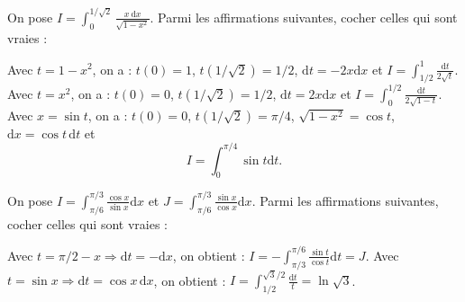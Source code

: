 \begin{question}
On pose $\displaystyle I=\int _{0}^{1/\sqrt{2}}\frac{x\ \mathrm{d}x}{\sqrt{1-x^2}}$. Parmi les affirmations suivantes, cocher celles qui sont vraies :
\begin{answers}
\end{answers}
\vskip3mm
\begin{explanations}
Avec $t=1-x^2$, on a : $t(0)=1$, $t(1/\sqrt{2})=1/2$, $\mathrm{d}t=-2x\mathrm{d}x$ et $\displaystyle I=\int _{1/2}^1\frac{\mathrm{d}t}{2\sqrt{t}}$.
\vskip0mm
Avec $t=x^2$, on a : $t(0)=0$, $t(1/\sqrt{2})=1/2$, $\mathrm{d}t=2x\mathrm{d}x$ et $\displaystyle I=\int _0^{1/2}\frac{\mathrm{d}t}{2\sqrt{1-t}}$.
\vskip0mm
Avec $x=\sin t$, on a : $t(0)=0$, $t(1/\sqrt{2})=\pi/4$, $\sqrt{1-x^2}=\cos t$, $\mathrm{d}x=\cos t\, \mathrm{d}t$ et 
$$\displaystyle I=\int _0^{\pi/4}\sin t\mathrm{d}t.$$
\end{explanations}
\end{question}

\begin{question}
On pose $\displaystyle I=\int _{\pi/6}^{\pi/3}\frac{\cos x}{\sin x}\mathrm{d}x$ et $\displaystyle J=\int _{\pi/6}^{\pi/3}\frac{\sin x}{\cos x}\mathrm{d}x$. Parmi les affirmations suivantes, cocher celles qui sont vraies :
\begin{answers}
\end{answers}
\begin{explanations}
Avec $t=\pi/2- x\Rightarrow \mathrm{d}t=-\mathrm{d}x$, on obtient : $\displaystyle I=-\int _{\pi/3}^{\pi/6}\frac{\sin t}{\cos t}\mathrm{d}t=J$.
\vskip0mm
Avec $t=\sin x\Rightarrow \mathrm{d}t=\cos x\, \mathrm{d}x$, on obtient : $\displaystyle I=\int _{1/2}^{\sqrt{3}/2}\frac{\mathrm{d}t}{t}=\ln \sqrt{3}$.
\end{explanations}
\end{question}

